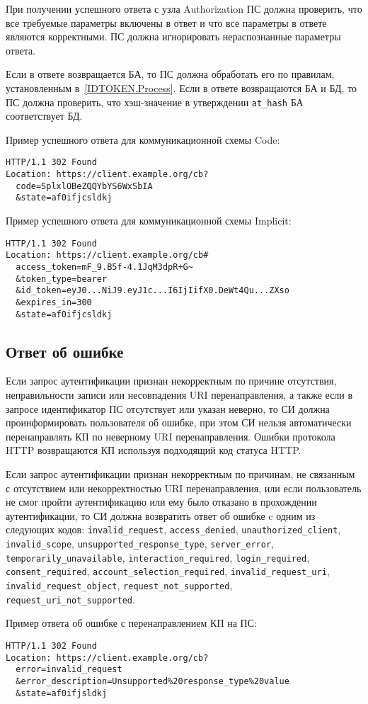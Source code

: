При получении успешного ответа с узла Authorization ПС должна 
проверить, что все требуемые параметры включены в ответ
и что все параметры в ответе являются корректными.
%
ПС должна игнорировать нераспознанные параметры ответа.

Если в ответе возвращается БА, то ПС должна обработать его по правилам, 
установленным в~\ref{IDTOKEN.Process}. 
%
Если в ответе возвращаются БА и БД, то ПС должна проверить, что хэш-значение
в утверждении \lstinline{at_hash} БА соответствует БД.

Пример успешного ответа для коммуникационной схемы Code:
%
\begin{lstlisting}
HTTP/1.1 302 Found
Location: https://client.example.org/cb?
  code=SplxlOBeZQQYbYS6WxSbIA
  &state=af0ifjcsldkj
\end{lstlisting}

Пример успешного ответа для коммуникационной схемы Implicit:
%
\begin{lstlisting}
HTTP/1.1 302 Found
Location: https://client.example.org/cb#
  access_token=mF_9.B5f-4.1JqM3dpR+G~
  &token_type=bearer
  &id_token=eyJ0...NiJ9.eyJ1c...I6IjIifX0.DeWt4Qu...ZXso
  &expires_in=300
  &state=af0ifjcsldkj
\end{lstlisting}

\subsection{Ответ об ошибке}\label{REQRESP.Auth.Error}

Если запрос аутентификации признан некорректным по причине отсутствия,
неправильности записи или несовпадения URI перенаправления, а также если в
запросе идентификатор ПС отсутствует или указан неверно, то СИ должна
проинформировать пользователя об ошибке, при этом СИ нельзя автоматически
перенаправлять КП по неверному URI перенаправления. Ошибки протокола HTTP
возвращаются КП используя подходящий код статуса HTTP.

Если запрос аутентификации признан некорректным по причинам, не связанным с
отсутствием или некорректностью URI перенаправления, или если пользователь не
смог пройти аутентификацию или ему было отказано в прохождении аутентификации,
то СИ должна возвратить ответ об ошибке c одним из следующих кодов:
%
\lstinline{invalid_request}, 
\lstinline{access_denied},
\lstinline{unauthorized_client}, 
\lstinline{invalid_scope},
\lstinline{unsupported_response_type},
\lstinline{server_error}, 
\lstinline{temporarily_unavailable}, 
\lstinline{interaction_required},
\lstinline{login_required},
\lstinline{consent_required},
\lstinline{account_selection_required},
\lstinline{invalid_request_uri},
\lstinline{invalid_request_object},
\lstinline{request_not_supported}, 
\lstinline{request_uri_not_supported}. 

Пример ответа об ошибке с перенаправлением КП на ПС:
\begin{lstlisting}
HTTP/1.1 302 Found
Location: https://client.example.org/cb?
  error=invalid_request
  &error_description=Unsupported%20response_type%20value
  &state=af0ifjsldkj
\end{lstlisting}

